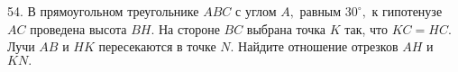 54. В прямоугольном треугольнике $ABC$ с углом $A,$ равным $30^\circ,$ к гипотенузе $AC$ проведена высота $BH.$ На стороне $BC$ выбрана точка $K$ так, что $KC=HC.$ Лучи $AB$ и $HK$ пересекаются в точке $N.$ Найдите отношение отрезков $AH$ и $KN.$\\
